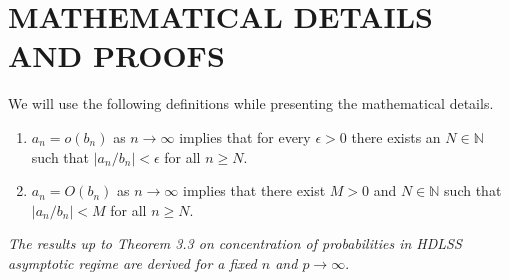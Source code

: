 \documentclass[twoside]{article}
\newcommand{\0}{\mathbf{0}}
\newcommand{\1}{\mathbf{1}}
\numberwithin{equation}{section}
\begin{document}
%

%

\onecolumn
{}
\section*{MATHEMATICAL DETAILS AND PROOFS}
\begin{tcolorbox}[colback = white]
We will use the following definitions while presenting the mathematical details.
\begin{enumerate}
 \item $a_n=o(b_n)$ as $n\to\infty$ implies that for every $\epsilon>0$ there exists an $N\in\mathbb{N}$ such that $|a_n/b_n|<\epsilon$ for all $n\geq N$.
 \item $a_n=O(b_n)$ as $n\to\infty$ implies that there exist $M>0$ and $N\in\mathbb{N}$ such that $|a_n/b_n|<M$ for all $n\geq N$.
\end{enumerate}
\end{tcolorbox}
\vspace{0.5cm}
\emph{The results up to Theorem 3.3 on concentration of probabilities in HDLSS asymptotic regime are derived for a fixed $n$ and $p\to\infty$}.\newline

\end{document}
